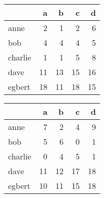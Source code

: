 \begin{tabular}{lrrrr}
\toprule
{} &   a &   b &   c &   d \\
\midrule
anne    &   2 &   1 &   2 &   6 \\
bob     &   4 &   4 &   4 &   5 \\
charlie &   1 &   1 &   5 &   8 \\
dave    &  11 &  13 &  15 &  16 \\
egbert  &  18 &  11 &  18 &  15 \\
\bottomrule
\end{tabular}
\begin{tabular}{lrrrr}
\toprule
{} &   a &   b &   c &   d \\
\midrule
anne    &   7 &   2 &   4 &   9 \\
bob     &   5 &   6 &   0 &   1 \\
charlie &   0 &   4 &   5 &   1 \\
dave    &  11 &  12 &  17 &  18 \\
egbert  &  10 &  11 &  15 &  18 \\
\bottomrule
\end{tabular}
